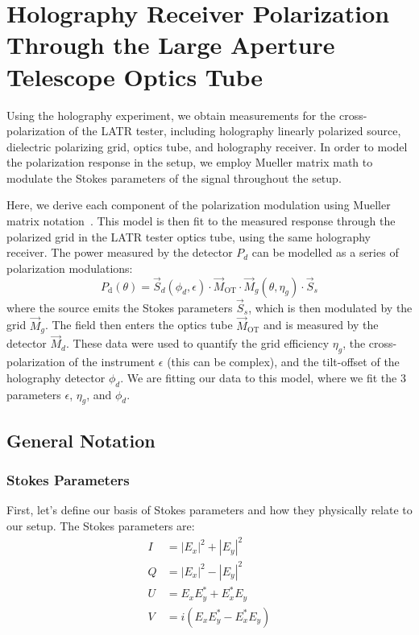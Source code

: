 \chapter{Holography Receiver Polarization Through the Large Aperture Telescope Optics Tube} 
\label{app:pol} 
Using the holography experiment, we obtain measurements for the cross-polarization of the LATR tester, including holography linearly polarized source, dielectric polarizing grid, optics tube, and holography receiver.  In order to model the polarization response in the setup, we employ Mueller matrix math to modulate the Stokes parameters of the signal throughout the setup.  

Here, we derive each component of the polarization modulation using Mueller matrix notation~\cite{Simon:10}.  This model is then fit to the measured response through the polarized grid in the LATR tester optics tube, using the same holography receiver.  The power measured by the detector $P_{d}$ can be modelled as a series of polarization modulations: 
\begin{equation}
    P_{\text{d}}(\theta) = \vec{S}_{d}(\phi_{d},\epsilon)\cdot \vec{M}_{\text{OT}}\cdot \vec{M}_{g}(\theta,\eta_{g})\cdot \vec{S}_{s}
    \label{eq:holo_model}
\end{equation}
where the source emits the Stokes parameters $\vec{S}_{s}$, which is then modulated by the grid $\vec{M}_{g}$.  The field then enters the optics tube $\vec{M}_{\text{OT}}$ and is measured by the detector $\vec{M}_{d}$.  These data were used to quantify the grid efficiency $\eta_{g}$, the cross-polarization of the instrument $\epsilon$ (this can be complex), and the tilt-offset of the holography detector $\phi_{d}$.  We are fitting our data to this model, where we fit the 3 parameters $\epsilon$, $\eta_{g}$, and $\phi_{d}$.
\section{General Notation}
\subsection{Stokes Parameters}
First, let's define our basis of Stokes parameters and how they physically relate to our setup.  The Stokes parameters are:
\begin{equation}
\begin{split}
    I & = |E_x|^2 + |E_y|^2 \\
    Q & = |E_x|^2 - |E_y|^2 \\
    U & = E_x E_y^* + E_x^*E_y\\
    V & = i(E_x E_y^* - E_x^*E_y) \\
\end{split}
\end{equation}
